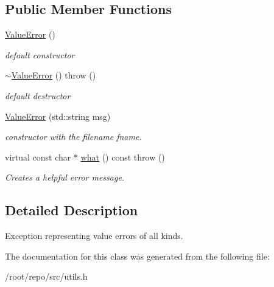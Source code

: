 \subsection*{Public Member Functions}
\begin{DoxyCompactItemize}
\item 
\mbox{\label{classpyne_1_1_value_error_a99845e7601cc6e6db6a3ef6d904795e2}} 
\hyperlink{classpyne_1_1_value_error_a99845e7601cc6e6db6a3ef6d904795e2}{Value\+Error} ()
\begin{DoxyCompactList}\small\item\em default constructor \end{DoxyCompactList}\item 
\mbox{\label{classpyne_1_1_value_error_a9925f29080ee4da11b17522550579aa8}} 
\hyperlink{classpyne_1_1_value_error_a9925f29080ee4da11b17522550579aa8}{$\sim$\+Value\+Error} ()  throw ()
\begin{DoxyCompactList}\small\item\em default destructor \end{DoxyCompactList}\item 
\mbox{\label{classpyne_1_1_value_error_a628862d2a78b9491d46f7c4814dfed9f}} 
\hyperlink{classpyne_1_1_value_error_a628862d2a78b9491d46f7c4814dfed9f}{Value\+Error} (std\+::string msg)
\begin{DoxyCompactList}\small\item\em constructor with the filename {\itshape fname}. \end{DoxyCompactList}\item 
\mbox{\label{classpyne_1_1_value_error_a34517c66d43b9aaebbe181c6a4156103}} 
virtual const char $\ast$ \hyperlink{classpyne_1_1_value_error_a34517c66d43b9aaebbe181c6a4156103}{what} () const  throw ()
\begin{DoxyCompactList}\small\item\em Creates a helpful error message. \end{DoxyCompactList}\end{DoxyCompactItemize}


\subsection{Detailed Description}
Exception representing value errors of all kinds. 

The documentation for this class was generated from the following file\+:\begin{DoxyCompactItemize}
\item 
/root/repo/src/utils.\+h\end{DoxyCompactItemize}
